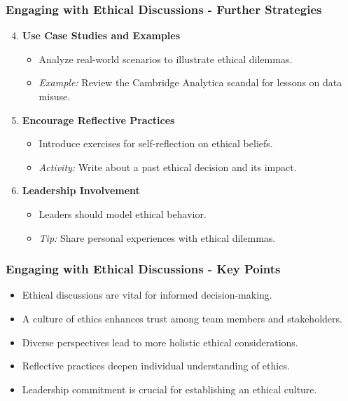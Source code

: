 \documentclass{beamer}
\begin{document}
\begin{frame}[fragile]
    \frametitle{Engaging with Ethical Discussions - Further Strategies}
    \begin{enumerate}
        \setcounter{enumi}{3}
        \item \textbf{Use Case Studies and Examples}
        \begin{itemize}
            \item Analyze real-world scenarios to illustrate ethical dilemmas.
            \item \textit{Example:} Review the Cambridge Analytica scandal for lessons on data misuse.
        \end{itemize}

        \item \textbf{Encourage Reflective Practices}
        \begin{itemize}
            \item Introduce exercises for self-reflection on ethical beliefs.
            \item \textit{Activity:} Write about a past ethical decision and its impact.
        \end{itemize}

        \item \textbf{Leadership Involvement}
        \begin{itemize}
            \item Leaders should model ethical behavior.
            \item \textit{Tip:} Share personal experiences with ethical dilemmas.
        \end{itemize}
    \end{enumerate}
\end{frame}

\begin{frame}[fragile]
    \frametitle{Engaging with Ethical Discussions - Key Points}
    \begin{itemize}
        \item Ethical discussions are vital for informed decision-making.
        \item A culture of ethics enhances trust among team members and stakeholders.
        \item Diverse perspectives lead to more holistic ethical considerations.
        \item Reflective practices deepen individual understanding of ethics.
        \item Leadership commitment is crucial for establishing an ethical culture.
    \end{itemize}
\end{frame}
\end{document}
